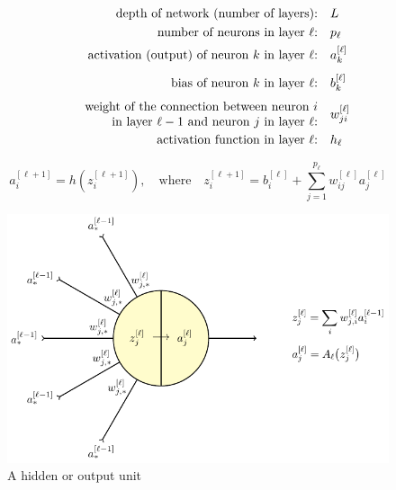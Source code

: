 \documentclass{beamer}
\begin{document}
\begin{frame}{}
    \begin{align*}
        \text{depth of network (number of layers):\quad}&L\\
        \text{number of neurons in layer $\ell$:\quad}&p_\ell\\
        \text{activation (output) of neuron $k$ in layer $\ell$:\quad}
        & a_k^{[\ell]}\\[1ex]
        \text{bias of neuron $k$ in layer $\ell$:\quad}& b_k^{[\ell]}\\[1ex]
        \text{\parbox{3in}{\raggedleft weight of the connection between neuron $i$\\
        in layer $\ell-1$ and neuron $j$ in layer $\ell$:}\quad}& w^{[\ell]}_{ji}\\
        \text{activation function in layer $\ell$:\quad}&h_\ell
    \end{align*}

    \[
        a^{[\ell+1]}_i = h\left(z_i^{[\ell+1]}\right),
        \quad\text{where}\quad
        z_i^{[\ell+1]}=b_i^{[\ell]} + \sum_{j=1}^{p_\ell} w_{ij}^{[\ell]}a_j^{[\ell]}
    \]
\end{frame}

\begin{frame}{}
    \begin{figure}
    \includegraphics[scale=0.9]{./neuron/neuron.pdf}
    \caption{A hidden or output unit}
    \end{figure}
\end{frame}
\end{document}

